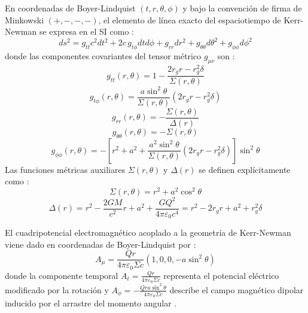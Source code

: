 En coordenadas de Boyer-Lindquist $(t, r, \theta, \phi)$ y bajo la convención de firma de Minkowski $(+,-,-,-)$, el elemento de línea exacto del espaciotiempo de Kerr-Newman se expresa en el SI como \citep{1403.5234v2, pdfcoffee.com_chandrasekhar}:
\begin{equation}
    ds^2 = g_{tt} c^2 dt^2 + 2 c \, g_{t\phi} dt d\phi + g_{rr} dr^2 + g_{\theta\theta} d\theta^2 + g_{\phi\phi} d\phi^2
    \label{eq:linea_kerr_newman_general}
\end{equation}
donde las componentes covariantes del tensor métrico $g_{\mu\nu}$ son \citep{1403.5234v2, s10052-021-09180-y}:
\begin{equation}
    g_{tt}(r,\theta) = 1 - \frac{2r_g r - r_g^2 \delta}{\Sigma(r,\theta)}
    \label{eq:gtt_KN}
\end{equation}
\begin{equation}
    g_{t\phi}(r,\theta) = \frac{a \sin^2\theta}{\Sigma(r,\theta)} \left( 2r_g r - r_g^2 \delta \right)
    \label{eq:gtphi_KN}
\end{equation}
\begin{equation}
    g_{rr}(r,\theta) = -\frac{\Sigma(r,\theta)}{\Delta(r)}
    \label{eq:grr_KN}
\end{equation}
\begin{equation}
    g_{\theta\theta}(r,\theta) = -\Sigma(r,\theta)
    \label{eq:gthetatheta_KN}
\end{equation}
\begin{equation}
    g_{\phi\phi}(r,\theta) = -\left[ r^2 + a^2 + \frac{a^2 \sin^2\theta}{\Sigma(r,\theta)} \left( 2r_g r - r_g^2 \delta \right) \right] \sin^2\theta
    \label{eq:gphiphi_KN}
\end{equation}
Las funciones métricas auxiliares $\Sigma(r,\theta)$ y $\Delta(r)$ se definen explícitamente como \citep{1403.5234v2, s10052-021-09180-y}:
\begin{equation}
    \Sigma(r,\theta) = r^2 + a^2 \cos^2\theta
    \label{eq:sigma_def_detallada}
\end{equation}
\begin{equation}
    \Delta(r) = r^2 - \frac{2GM}{c^2}r + a^2 + \frac{G Q^2}{4\pi\varepsilon_0 c^4} = r^2 - 2 r_g r + a^2 + r_g^2 \delta
    \label{eq:delta_def_detallada}
\end{equation}

El cuadripotencial electromagnético acoplado a la geometría de Kerr-Newman viene dado en coordenadas de Boyer-Lindquist por \citep{1403.5234v2, Sean_Carroll_Spacetime}:
\begin{equation}
    A_\mu = \frac{Q r}{4\pi\varepsilon_0 \Sigma c} \left( 1, 0, 0, -a \sin^2\theta \right)
    \label{eq:cuadripotencial_KN}
\end{equation}
donde la componente temporal $A_t = \frac{Q r}{4\pi\varepsilon_0 \Sigma c}$ representa el potencial eléctrico modificado por la rotación y $A_\phi = -\frac{Q r a \sin^2\theta}{4\pi\varepsilon_0 \Sigma c}$ describe el campo magnético dipolar inducido por el arrastre del momento angular \citep{M_P_Hobson_General_Relativity}.

